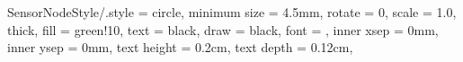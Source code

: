 \def\BayStationPosition{(0,0)}
%
\def\SensorOnePosition{(-1.2,   -0.3)}
\def\SensorTwoPosition{(-1.5,   0.3)}
\def\SensorThreePosition{(-1.3, 1.1)}
\def\SensorFourPosition{(-0.3,  1.6)}
\def\SensorFivePosition{(0.3,   2.2)}
\def\SensorSixPosition{(0.7,    1.7)}
\def\SensorSevenPosition{(1.7,  1.8)}
\def\SensorEightPosition{(1.6,  0.8)}
\def\SensorNinePosition{(2.1,   0.3)}
\def\SensorTenPosition{(1.8,    -0.4)}
\def\SensorElevenPosition{(1.0, -0.7)}
\def\SensorTwelvePosition{(1.0, -1.4)}
\def\SensorThirteenPosition{(0.0,   -2.2)}
\def\SensorFourteenPosition{(-0.3,  -1.4)}
\def\SensorFifteenPosition{(-1.3,   -1.9)}





\tikzset
{
    SensorNodeStyle/.style =
    {
        circle,                                 %
        minimum size    = 4.5mm,                %
        rotate          = 0,                    %
        scale           = 1.0,                  %
        thick,                                  %
        fill            = green!10,             %
        text            = black,                %
        draw            = black,                %
        font            = \scriptsize,              %
        inner xsep      = 0mm,                  %
        inner ysep      = 0mm,                  %
        text height     = 0.2cm,
        text depth      = 0.12cm,
    }
}






